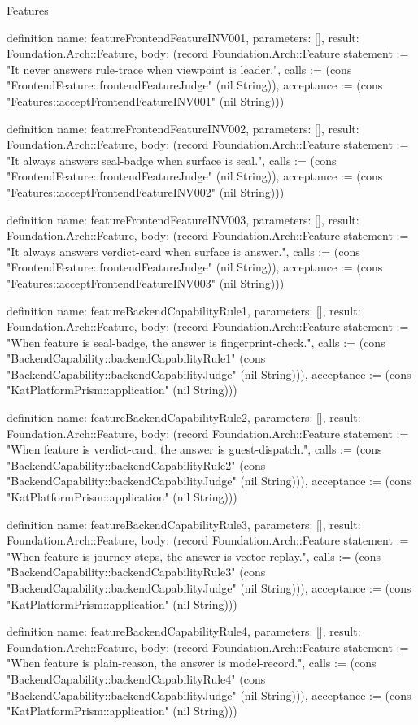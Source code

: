 \begin{lexlean}{Features}
\begin{semanticmodule}
definition{
  name: featureFrontendFeatureINV001,
  parameters: [],
  result: Foundation.Arch::Feature,
  body: (record Foundation.Arch::Feature {statement := "It never answers rule-trace when viewpoint is leader.", calls := (cons "FrontendFeature::frontendFeatureJudge" (nil String)), acceptance := (cons "Features::acceptFrontendFeatureINV001" (nil String))})
}

definition{
  name: featureFrontendFeatureINV002,
  parameters: [],
  result: Foundation.Arch::Feature,
  body: (record Foundation.Arch::Feature {statement := "It always answers seal-badge when surface is seal.", calls := (cons "FrontendFeature::frontendFeatureJudge" (nil String)), acceptance := (cons "Features::acceptFrontendFeatureINV002" (nil String))})
}

definition{
  name: featureFrontendFeatureINV003,
  parameters: [],
  result: Foundation.Arch::Feature,
  body: (record Foundation.Arch::Feature {statement := "It always answers verdict-card when surface is answer.", calls := (cons "FrontendFeature::frontendFeatureJudge" (nil String)), acceptance := (cons "Features::acceptFrontendFeatureINV003" (nil String))})
}

definition{
  name: featureBackendCapabilityRule1,
  parameters: [],
  result: Foundation.Arch::Feature,
  body: (record Foundation.Arch::Feature {statement := "When feature is seal-badge, the answer is fingerprint-check.", calls := (cons "BackendCapability::backendCapabilityRule1" (cons "BackendCapability::backendCapabilityJudge" (nil String))), acceptance := (cons "KatPlatformPrism::application" (nil String))})
}

definition{
  name: featureBackendCapabilityRule2,
  parameters: [],
  result: Foundation.Arch::Feature,
  body: (record Foundation.Arch::Feature {statement := "When feature is verdict-card, the answer is guest-dispatch.", calls := (cons "BackendCapability::backendCapabilityRule2" (cons "BackendCapability::backendCapabilityJudge" (nil String))), acceptance := (cons "KatPlatformPrism::application" (nil String))})
}

definition{
  name: featureBackendCapabilityRule3,
  parameters: [],
  result: Foundation.Arch::Feature,
  body: (record Foundation.Arch::Feature {statement := "When feature is journey-steps, the answer is vector-replay.", calls := (cons "BackendCapability::backendCapabilityRule3" (cons "BackendCapability::backendCapabilityJudge" (nil String))), acceptance := (cons "KatPlatformPrism::application" (nil String))})
}

definition{
  name: featureBackendCapabilityRule4,
  parameters: [],
  result: Foundation.Arch::Feature,
  body: (record Foundation.Arch::Feature {statement := "When feature is plain-reason, the answer is model-record.", calls := (cons "BackendCapability::backendCapabilityRule4" (cons "BackendCapability::backendCapabilityJudge" (nil String))), acceptance := (cons "KatPlatformPrism::application" (nil String))})
}


\end{semanticmodule}
\end{lexlean}
